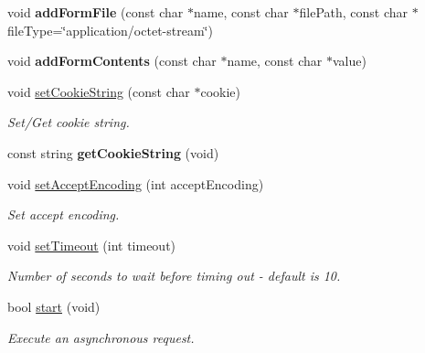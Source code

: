 \begin{DoxyCompactItemize}
\mbox{\label{classHTTPRequest_a4bccc607711858b3f8902c714aa45fc8}} 
void {\bfseries add\+Form\+File} (const char $\ast$name, const char $\ast$file\+Path, const char $\ast$file\+Type=\char`\"{}application/octet-\/stream\char`\"{})
\item 
\mbox{\label{classHTTPRequest_ab104f5d95a6f5bf3c61f3db646b5e1db}} 
void {\bfseries add\+Form\+Contents} (const char $\ast$name, const char $\ast$value)
\item 
\mbox{\label{classHTTPRequest_aa0ea043ee12472004e29f0dd3d39d499}} 
void \hyperlink{classHTTPRequest_aa0ea043ee12472004e29f0dd3d39d499}{set\+Cookie\+String} (const char $\ast$cookie)
\begin{DoxyCompactList}\small\item\em Set/\+Get cookie string. \end{DoxyCompactList}\item 
\mbox{\label{classHTTPRequest_a15cef2a3d32a08159501ec76ae9af1cf}} 
const string {\bfseries get\+Cookie\+String} (void)
\item 
\mbox{\label{classHTTPRequest_af24be8ab7517999522aa7b27e55cc0f0}} 
void \hyperlink{classHTTPRequest_af24be8ab7517999522aa7b27e55cc0f0}{set\+Accept\+Encoding} (int accept\+Encoding)
\begin{DoxyCompactList}\small\item\em Set accept encoding. \end{DoxyCompactList}\item 
\mbox{\label{classHTTPRequest_aa05d522d24919e92edd0c7c49f9cef7d}} 
void \hyperlink{classHTTPRequest_aa05d522d24919e92edd0c7c49f9cef7d}{set\+Timeout} (int timeout)
\begin{DoxyCompactList}\small\item\em Number of seconds to wait before timing out -\/ default is 10. \end{DoxyCompactList}\item 
\mbox{\label{classHTTPRequest_abafb27559ed152937e4b0ff09f9b291a}} 
bool \hyperlink{classHTTPRequest_abafb27559ed152937e4b0ff09f9b291a}{start} (void)
\begin{DoxyCompactList}\small\item\em Execute an asynchronous request. \end{DoxyCompactList}\item 

\end{DoxyCompactItemize}
